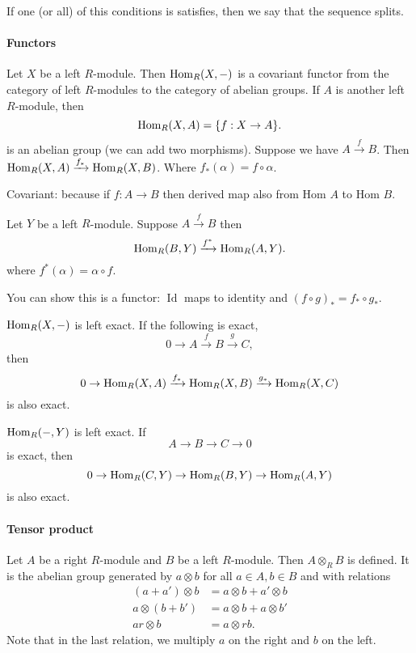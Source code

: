 If one (or all) of this conditions is satisfies, then we say that the sequence splits.


\paragraph{Functors}
Let $X$ be a left $R$-module.
Then $\operatorname{Hom}_R(X, -)$ is a covariant functor from the category of left $R$-modules to the category of abelian groups.
If $A$ is another left $R$-module, then
\[
    \operatorname{Hom}_{R}(X, A) = \{f : X \to  A \}
.\] 
is an abelian group (we can add two morphisms). 
Suppose we have $A \xrightarrow{f} B$.
Then $ \operatorname{Hom}_{R}(X, A) \xrightarrow{f_*} \operatorname{Hom}_{R}(X, B)$.
Where $f_*(\alpha) = f  \circ  \alpha$.

Covariant: because if $f : A \to  B$ then derived map also from Hom $A$ to Hom $B$.


Let $Y$ be a left $R$-module.
Suppose $A \xrightarrow{f} B$ then 
\[
\operatorname{Hom}_{R}(B, Y) \xrightarrow{f^{*}}  \operatorname{Hom}_{R}(A, Y)
.\] 
where $f^{*}(\alpha) = \alpha  \circ  f$.

You can show this is a functor:  $\operatorname{Id}$ maps to identity and $(f  \circ g)_* = f_*  \circ  g_*$.


\begin{theorem}
    $ \operatorname{Hom}_{R}(X, -)$ is left exact.
    If  the following is exact,
    \[
    0 \to  A \xrightarrow{f} B \xrightarrow{g}  C
    ,\] 
    then
    \[
    0 \to  \operatorname{Hom}_{R}(X, A) \xrightarrow{f_*} \operatorname{Hom}_{R}(X, B) \xrightarrow{g_*}   \operatorname{Hom}_{R}(X, C)
    \] 
    is also exact.
\end{theorem}
\begin{theorem}
    $ \operatorname{Hom}_{R}(-, Y)$ is left exact.
    If 
    \[
    A \to B \to  C \to  0
    \] 
    is exact, then
    \[
    0 \to  \operatorname{Hom}_{R}(C, Y) \to  \operatorname{Hom}_{R}(B, Y) \to  \operatorname{Hom}_{R}(A, Y)
    \] 
    is also exact.
\end{theorem}

\paragraph{Tensor product}

Let $A$ be a right $R$-module and $B$ be a left $R$-module.
Then $A \otimes_R B$ is defined.
It is the abelian group generated by $a \otimes b$ for all $a \in A, b \in B$
and with relations 
\begin{align*}
    (a + a') \otimes b &= a \otimes b + a' \otimes b\\
    a \otimes (b + b') &= a \otimes b + a \otimes b'\\
    a r\otimes b &= a \otimes rb
.\end{align*} 
Note that in the last relation, we multiply $a$ on the right and $b$ on the left.

